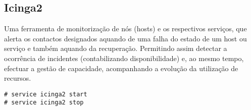 \subsection{Icinga2}

Uma ferramenta de monitorização de nós (hosts) e os respectivos serviços, que alerta os contactos designados aquando de uma falha do estado de um host ou serviço e também aquando da recuperação. Permitindo assim detectar a ocorrência de incidentes (contabilizando disponibilidade) e, ao mesmo tempo, efectuar a gestão de capacidade, acompanhando a evolução da utilização de recursos.

\begin{Verbatim}[commandchars=\\\{\}]
# service icinga2 start
# service icinga2 stop
\end{Verbatim}

